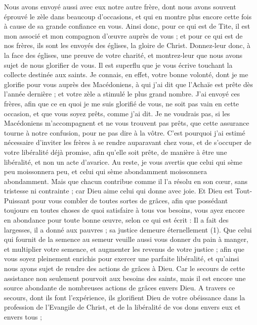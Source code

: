 \begin{multicols}{2}
Nous avons envoyé aussi avec eux notre autre frère, dont nous avons souvent éprouvé le zèle dans beaucoup d’occasions, et qui en montre plus encore cette fois à cause de sa grande confiance en vous.
Ainsi donc, pour ce qui est de Tite, il est mon associé et mon compagnon d’œuvre auprès de vous ; et pour ce qui est de nos frères, ils sont les envoyés des églises, la gloire de Christ.
Donnez-leur donc, à la face des églises, une preuve de votre charité, et montrez-leur que nous avons sujet de nous glorifier de vous.
\VerseOne{}Il est superflu que je vous écrive touchant la collecte destinée aux saints.
Je connais, en effet, votre bonne volonté, dont je me glorifie pour vous auprès des Macédoniens, à qui j’ai dit que l’Achaïe est prête dès l'année dernière ; et votre zèle a stimulé le plus grand nombre.
J’ai envoyé ces frères, afin que ce en quoi je me suis glorifié de vous, ne soit pas vain en cette occasion, et que vous soyez prêts, comme j'ai dit.
Je ne voudrais pas, si les Macédoniens m’accompagnent et ne vous trouvent pas prêts, que cette assurance tourne à notre confusion, pour ne pas dire à la vôtre.
C'est pourquoi j'ai estimé nécessaire d’inviter les frères à se rendre auparavant chez vous, et de s’occuper de votre libéralité déjà promise, afin qu'elle soit prête, de manière à être une libéralité, et non un acte d’avarice.
Au reste, je vous avertis que celui qui sème peu moissonnera peu, et celui qui sème abondamment moissonnera abondamment.
Mais que chacun contribue comme il l’a résolu en son cœur, sans tristesse ni contrainte ; car Dieu aime celui qui donne avec joie.
Et Dieu est Tout-Puissant pour vous combler de toutes sortes de grâces, afin que possédant toujours en toutes choses de quoi satisfaire à tous vos besoins, vous ayez encore en abondance pour toute bonne œuvre,
selon ce qui est écrit : Il a fait des largesses, il a donné aux pauvres ; sa justice demeure éternellement (1).
Que celui qui fournit de la semence au semeur veuille aussi vous donner du pain à manger, et multiplier votre semence, et augmenter les revenus de votre justice ;
afin que vous soyez pleinement enrichis pour exercer une parfaite libéralité, et qu’ainsi nous ayons sujet de rendre des actions de grâces à Dieu.
Car le secours de cette assistance non seulement pourvoit aux besoins des saints, mais il est encore une source abondante de nombreuses actions de grâces envers Dieu.
A travers ce secours, dont ils font l’expérience, ils glorifient Dieu de votre obéissance dans la profession de l’Evangile de Christ, et de la libéralité de vos dons envers eux et envers tous ;

\end{multicols}
